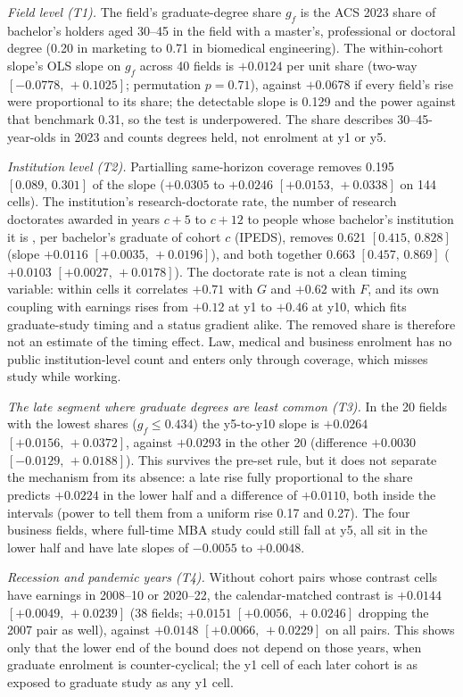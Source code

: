 \documentclass[11pt]{article}
\newcommand{\ci}[2]{$[#1,\allowbreak\,#2]$}
\begin{document}
\emph{Field level (T1).} The field's graduate-degree share $g_f$ is the ACS 2023 share of bachelor's holders aged
30--45 in the field with a master's, professional or doctoral degree (0.20 in marketing to 0.71 in biomedical
engineering). The within-cohort slope's OLS slope on $g_f$ across 40 fields is $+0.0124$ per unit share (two-way
\ci{-0.0778}{+0.1025}; permutation $p=0.71$), against $+0.0678$ if every field's rise were proportional to its share;
the detectable slope is 0.129 and the power against that benchmark 0.31, so the test is underpowered. The share
describes 30--45-year-olds in 2023 and counts degrees held, not enrolment at y1 or y5.

\emph{Institution level (T2).} Partialling same-horizon coverage removes 0.195 \ci{0.089}{0.301} of the slope
($+0.0305$ to $+0.0246$ \ci{+0.0153}{+0.0338} on 144 cells). The institution's research-doctorate rate, the number of
research doctorates awarded in years $c+5$ to $c+12$ to people whose bachelor's institution it is \citep[Survey of
Earned Doctorates;][]{ncses_sed_bacc}, per bachelor's graduate of cohort $c$ (IPEDS), removes 0.621 \ci{0.415}{0.828}
(slope $+0.0116$ \ci{+0.0035}{+0.0196}), and both together 0.663 \ci{0.457}{0.869} ($+0.0103$ \ci{+0.0027}{+0.0178}).
The doctorate rate is not a clean timing variable: within cells it correlates $+0.71$ with $G$ and $+0.62$ with $F$,
and its own coupling with earnings rises from $+0.12$ at y1 to $+0.46$ at y10, which fits graduate-study timing and
a status gradient alike. The removed share is therefore not an estimate of the timing effect. Law, medical and
business enrolment has no public institution-level count and enters only through coverage, which misses study
while working.

\emph{The late segment where graduate degrees are least common (T3).} In the 20 fields with the lowest shares
($g_f\le0.434$) the y5-to-y10 slope is $+0.0264$ \ci{+0.0156}{+0.0372}, against $+0.0293$ in the other 20 (difference
$+0.0030$ \ci{-0.0129}{+0.0188}). This survives the pre-set rule, but it does not separate the mechanism from its
absence: a late rise fully proportional to the share predicts $+0.0224$ in the lower half and a difference of
$+0.0110$, both inside the intervals (power to tell them from a uniform rise 0.17 and 0.27). The four business
fields, where full-time MBA study could still fall at y5, all sit in the lower half and have late slopes of $-0.0055$
to $+0.0048$.

\emph{Recession and pandemic years (T4).} Without cohort pairs whose contrast cells have earnings in 2008--10 or
2020--22, the calendar-matched contrast is $+0.0144$ \ci{+0.0049}{+0.0239} (38 fields; $+0.0151$ \ci{+0.0056}{+0.0246}
dropping the 2007 pair as well), against $+0.0148$ \ci{+0.0066}{+0.0229} on all pairs. This shows only that the lower
end of the bound does not depend on those years, when graduate enrolment is counter-cyclical; the y1 cell of each
later cohort is as exposed to graduate study as any y1 cell.
\end{document}
